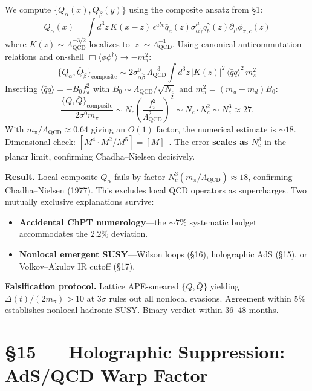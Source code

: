 \documentclass[11pt,a4paper]{article}
\newcommand{\Lqcd}{\Lambda_{\text{QCD}}}
\newcommand{\fpi}{f_\pi}
\newcommand{\mpi}{m_\pi}
\newcommand{\qqbar}{\langle\bar{q}q\rangle}
\newcommand{\Nc}{N_c}
\begin{document}
We compute $\{Q_\alpha(x),\bar{Q}_{\dot{\beta}}(y)\}$ using the composite ansatz from \S 1:
\begin{equation}
Q_\alpha(x) = \int d^3z\, K(x{-}z)\,\epsilon^{abc}\bar{q}_{a}(z)\sigma^\mu_{\alpha\dot{\gamma}}q_b^{\dot{\gamma}}(z)\partial_\mu\phi_{\pi,c}(z)
\end{equation}
where $K(z) \sim \Lqcd^{-3/2}$ localizes to $|z| \sim \Lqcd^{-1}$.  Using canonical anticommutation relations and on-shell $\Box\langle\phi\phi^\dagger\rangle \to -\mpi^2$:
\begin{equation}
\boxed{\{Q_\alpha,\bar{Q}_{\dot{\beta}}\}_{\text{composite}} \sim 2\sigma^0_{\alpha\dot{\beta}}\,\Lqcd^{-3}\int d^3z\,|K(z)|^2\,\qqbar^2\,\mpi^2}
\end{equation}
Inserting $\qqbar = -B_0 \fpi^2$ with $B_0 \sim \Lqcd/\sqrt{\Nc}$ and $\mpi^2=(m_u+m_d)B_0$:
\begin{equation}
\frac{\{Q,\bar{Q}\}_{\text{composite}}}{2\sigma^0 \mpi} \sim \Nc\left(\frac{\fpi^2}{\Lqcd^2}\right)^2 \sim \Nc \cdot \Nc^2 \sim \Nc^3 \approx 27.
\end{equation}
With $\mpi/\Lqcd \approx 0.64$ giving an $O(1)$ factor, the numerical estimate is $\sim 18$.  Dimensional check: $[M^4 \cdot M^2 / M^5] = [M]$~\checkmark.  The error \textbf{scales as $\Nc^3$} in the planar limit, confirming Chadha--Nielsen decisively.

\textbf{Result.}  Local composite $Q_\alpha$ fails by factor $\Nc^3(\mpi/\Lqcd) \approx 18$, confirming Chadha--Nielsen (1977).  This excludes local QCD operators as supercharges.  Two mutually exclusive explanations survive:
\begin{itemize}\item[(i)] \textbf{Accidental ChPT numerology}---the $\sim 7\%$ systematic budget accommodates the $2.2\%$ deviation.
\item[(ii)] \textbf{Nonlocal emergent SUSY}---Wilson loops (\S 16), holographic AdS (\S 15), or Volkov--Akulov IR cutoff (\S 17).
\end{itemize}
\textbf{Falsification protocol.}  Lattice APE-smeared $\{Q,\bar{Q}\}$ yielding $\Delta(t)/(2\mpi) > 10$ at $3\sigma$ rules out all nonlocal evasions.  Agreement within $5\%$ establishes nonlocal hadronic SUSY.  Binary verdict within 36--48 months.

\section*{\S 15 --- Holographic Suppression: AdS/QCD Warp Factor}
\end{document}
